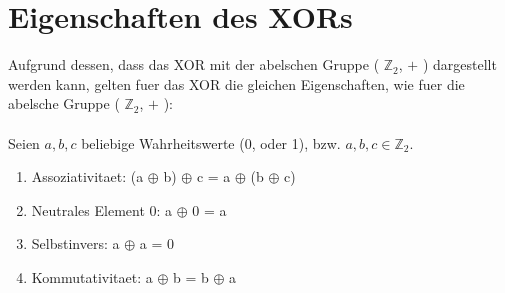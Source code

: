 \documentclass[a4paper,10pt,ngerman]{scrartcl}
\begin{document}
\section{Eigenschaften des XORs}
Aufgrund dessen, dass das XOR mit der abelschen Gruppe ( \(\mathbb{Z}_{2}\), \(+\) ) dargestellt werden kann, gelten fuer das XOR die gleichen Eigenschaften, wie fuer die abelsche Gruppe ( \(\mathbb{Z}_{2}\), \(+\) ):
\\\\Seien \(a, b, c\) beliebige Wahrheitswerte (0, oder 1), bzw. \(a, b, c \in \mathbb{Z}_{2}\).
\begin{enumerate}
	\item Assoziativitaet: (a \(\oplus\) b) \(\oplus\) c = a \(\oplus\) (b \(\oplus\) c)
	\item Neutrales Element 0: a \(\oplus\) 0 = a
	\item Selbstinvers: a \(\oplus\) a = 0
	\item Kommutativitaet: a \(\oplus\) b = b \(\oplus\) a
\end{enumerate}
\end{document}
